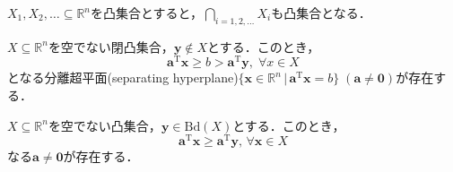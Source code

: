 \documentclass{jsreport}
\begin{document}
\begin{lemm}\label{lemm:convex}
  $X_1, X_2, \ldots \subseteq \mathbb{R}^n$を凸集合とすると，$\bigcap \limits_{i = 1, 2, \ldots} X_i$も凸集合となる．
\end{lemm}

\begin{lemm}[分離超平面の存在]\label{lemm:hyperplane1}
  $X \subseteq \mathbb{R}^n$を空でない閉凸集合，$\bm{y} \notin X$とする．このとき，
  \begin{equation}
    \bm{a}^{\mathrm{T}}\bm{x} \geq b > \bm{a}^{\mathrm{T}}\bm{y}, \; \forall x \in X \nonumber
  \end{equation}
  となる分離超平面(separating hyperplane)$\{\bm{x} \in \mathbb{R}^n \, | \, \bm{a}^{\mathrm{T}} \bm{x} = b\} \; (\bm{a} \neq \bm{0})$が存在する．
\end{lemm}


\begin{lemm}\label{lemm:hyperplane2}
  $X \subseteq \mathbb{R}^n$を空でない凸集合，$\bm{y} \in \mathrm{Bd}(X)$とする．このとき，
  \begin{equation}
    \bm{a}^{\mathrm{T}} \bm{x} \geq \bm{a}^{\mathrm{T}} \bm{y}, \, \forall \bm{x} \in X \nonumber
  \end{equation}
  なる$\bm{a} \neq \bm{0}$が存在する．
\end{lemm}
\end{document}
